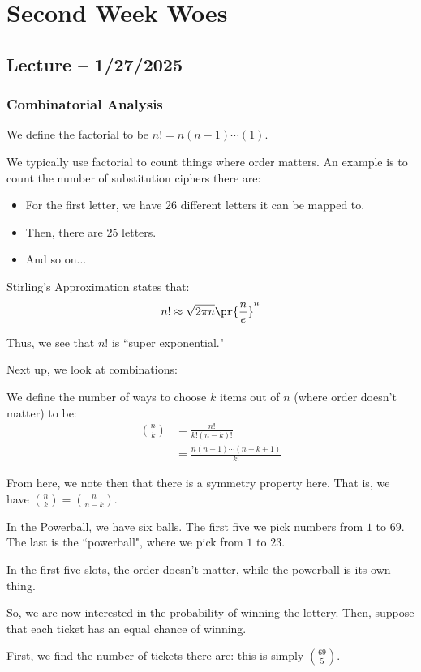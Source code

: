 \documentclass[openany]{book}
\begin{document}
\chapter{Second Week Woes}
\section{Lecture -- 1/27/2025}
\subsection{Combinatorial Analysis}
\begin{defn}[Factorial]
	We define the factorial to be $n! = n(n-1)\cdots(1)$.
\end{defn}

We typically use factorial to count things where order matters. An example is to count the number of substitution ciphers there are:
\begin{itemize}
	\item For the first letter, we have 26 different letters it can be mapped to.
	\item Then, there are 25 letters.
	\item And so on...
\end{itemize}

\begin{thm}
	Stirling's Approximation states that:
	\begin{equation*}
		n! \approx \sqrt{2\pi n}\pr{\frac n e}^{n}
	\end{equation*}
\end{thm}

Thus, we see that $n!$ is ``super exponential."

Next up, we look at combinations:
\begin{defn}[Combination]
	We define the number of ways to choose $k$ items out of $n$ (where order doesn't matter) to be:
	\begin{align*}
		\binom{n}{k} &= \frac{n!}{k!(n-k)!} \\
		&= \frac{n(n-1)\cdots(n-k+1)}{k!}
	\end{align*}
\end{defn}

From here, we note then that there is a symmetry property here. That is, we have $\binom{n}{k} = \binom{n}{n-k}$.

\begin{example}[Powerball]
	In the Powerball, we have six balls. The first five we pick numbers from $1$ to $69$. The last is the ``powerball", where we pick from $1$ to $23$.
	
	In the first five slots, the order doesn't matter, while the powerball is its own thing.
	
	So, we are now interested in the probability of winning the lottery. Then, suppose that each ticket has an equal chance of winning.
	
	First, we find the number of tickets there are: this is simply $\binom{69}{5}$.
\end{example}
\end{document}

